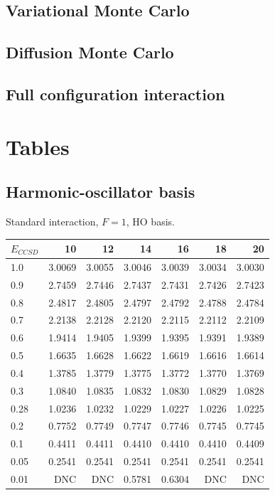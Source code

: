 \subsection{Variational Monte Carlo}
\subsection{Diffusion Monte Carlo}
\subsection{Full configuration interaction}


\FloatBarrier
\section{Tables}
\label{sec:results:theResults}
\subsection{Harmonic-oscillator basis}
\FloatBarrier

\begin{table}
\begin{center}
Standard interaction, $F=1$, HO basis.\\
\begin{tabular}{l|rrrrrr}
\hline 
$E_{CCSD}$ & 10 & 12 & 14 & 16 & 18 & 20 \\
\hline \hline
1.0 & 3.0069 & 3.0055 & 3.0046 & 3.0039 & 3.0034 & 3.0030  \\ 
0.9 & 2.7459 & 2.7446 & 2.7437 & 2.7431 & 2.7426 & 2.7423  \\ 
0.8 & 2.4817 & 2.4805 & 2.4797 & 2.4792 & 2.4788 & 2.4784  \\ 
0.7 & 2.2138 & 2.2128 & 2.2120 & 2.2115 & 2.2112 & 2.2109  \\ 
0.6 & 1.9414 & 1.9405 & 1.9399 & 1.9395 & 1.9391 & 1.9389  \\ 
0.5 & 1.6635 & 1.6628 & 1.6622 & 1.6619 & 1.6616 & 1.6614  \\ 
0.4 & 1.3785 & 1.3779 & 1.3775 & 1.3772 & 1.3770 & 1.3769  \\ 
0.3 & 1.0840 & 1.0835 & 1.0832 & 1.0830 & 1.0829 & 1.0828  \\ 
0.28 & 1.0236 & 1.0232 & 1.0229 & 1.0227 & 1.0226 & 1.0225  \\ 
0.2 & 0.7752 & 0.7749 & 0.7747 & 0.7746 & 0.7745 & 0.7745  \\ 
0.1 & 0.4411 & 0.4411 & 0.4410 & 0.4410 & 0.4410 & 0.4409  \\ 
0.05 & 0.2541 & 0.2541 & 0.2541 & 0.2541 & 0.2541 & 0.2541  \\ 
0.01 & DNC & DNC & 0.5781 & 0.6304 & DNC & DNC  \\ 
\hline \hline
\end{tabular}
\end{center}
\end{table}

